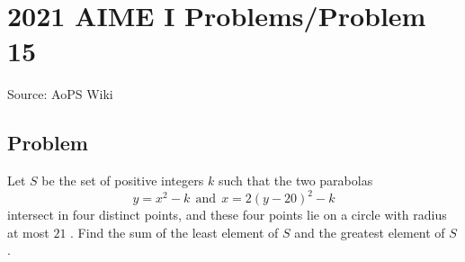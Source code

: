 \documentclass[12pt]{article}
\begin{document}
\section*{{2021 AIME I Problems/Problem 15}}
Source: AoPS Wiki

\subsection*{Problem}
Let $S$ be the set of positive integers $k$ such that the two parabolas \[y=x^2-k~~\text{and}~~x=2(y-20)^2-k\] intersect in four distinct points, and these four points lie on a circle with radius at most $21$ . Find the sum of the least element of $S$ and the greatest element of $S$ .
\end{document}
